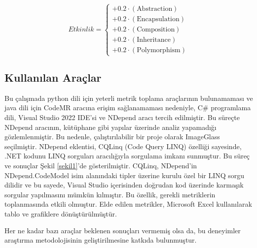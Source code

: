\documentclass[conference]{IEEEtran}
\begin{document}
\begin{equation}
	\textit{Etkinlik} =
	\begin{cases}
		+0.2 \cdot (\text{Abstraction}) \\
		+0.2 \cdot (\text{Encapsulation}) \\
		+0.2 \cdot (\text{Composition}) \\
		+0.2 \cdot (\text{Inheritance}) \\
		+0.2 \cdot (\text{Polymorphism})
	\end{cases}
	\label{equ:efficiency}
\end{equation}

\subsection{Kullanılan Araçlar}
Bu çalışmada python dili için yeterli metrik toplama araçlarının bulunamaması ve java dili için CodeMR aracına erişim sağlanamaması nedeniyle, C\# programlama dili, Visual Studio 2022 IDE'si ve NDepend aracı tercih edilmiştir. Bu süreçte NDepend aracının, kütüphane gibi yapılar üzerinde analiz yapamadığı gözlemlenmiştir. Bu nedenle, çalıştırılabilir bir proje olarak ImageGlass seçilmiştir. NDepend eklentisi, CQLinq (Code Query LINQ) özelliği sayesinde, .NET kodunu LINQ sorguları aracılığıyla sorgulama imkanı sunmuştur. Bu süreç ve sonuçlar Şekil \ref{sekil1}'de gösterilmiştir. CQLinq, NDepend'in NDepend.CodeModel isim alanındaki tipler üzerine kurulu özel bir LINQ sorgu dilidir ve bu sayede, Visual Studio içerisinden doğrudan kod üzerinde karmaşık sorgular yapılmasını mümkün kılmıştır. Bu özellik, gerekli metriklerin toplanmasında etkili olmuştur. Elde edilen metrikler, Microsoft Excel kullanılarak tablo ve grafiklere dönüştürülmüştür.

Her ne kadar bazı araçlar beklenen sonuçları vermemiş olsa da, bu deneyimler araştırma metodolojisinin geliştirilmesine katkıda bulunmuştur.
\end{document}
